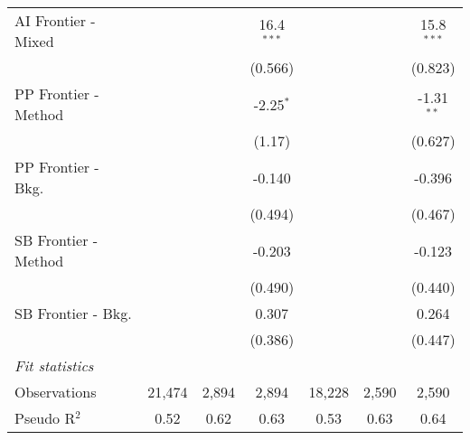 \begin{tabular}{lcccccc}
   AI Frontier - Mixed  &               &         & 16.4$^{***}$ &               &         & 15.8$^{***}$\\   
                        &               &         & (0.566)      &               &         & (0.823)\\   
   PP Frontier - Method &               &         & -2.25$^{*}$  &               &         & -1.31$^{**}$\\   
                        &               &         & (1.17)       &               &         & (0.627)\\   
   PP Frontier - Bkg.   &               &         & -0.140       &               &         & -0.396\\   
                        &               &         & (0.494)      &               &         & (0.467)\\   
   SB Frontier - Method &               &         & -0.203       &               &         & -0.123\\   
                        &               &         & (0.490)      &               &         & (0.440)\\   
   SB Frontier - Bkg.   &               &         & 0.307        &               &         & 0.264\\   
                        &               &         & (0.386)      &               &         & (0.447)\\   
   \midrule
   \emph{Fit statistics}\\
   Observations         & 21,474        & 2,894   & 2,894        & 18,228        & 2,590   & 2,590\\  
   Pseudo R$^2$         & 0.52          & 0.62    & 0.63         & 0.53          & 0.63    & 0.64\\  
   

\end{tabular}

